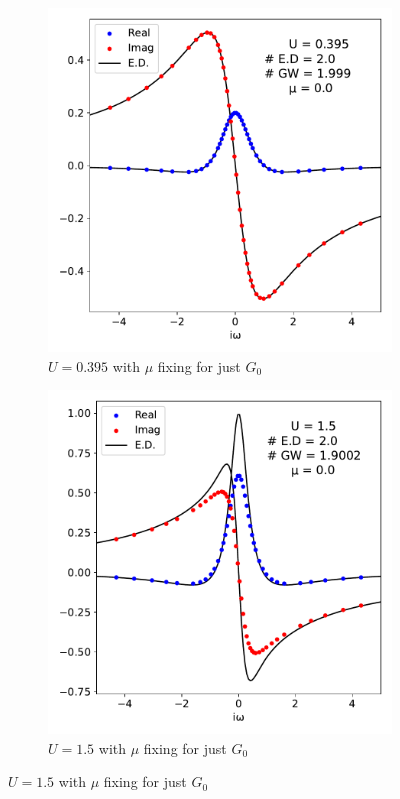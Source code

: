 \documentclass[12pt]{article}
\begin{document}
\begin{figure}[h!]
  \begin{subfigure}[b]{0.45\textwidth}
    \includegraphics[width=\textwidth]{after2.pdf}
    \caption{$U = 0.395$ with $\mu$ fixing for just $G_0$}
    \label{fig:sub3}
  \end{subfigure}
  \hspace{0.05\textwidth}
  \begin{subfigure}[b]{0.45\textwidth}
    \includegraphics[width=\textwidth]{after3.pdf}
    \caption{$U = 1.5$ with $\mu$ fixing for just $G_0$}
    \label{fig:sub4}
  \end{subfigure}
\end{figure}\\
\end{document}
